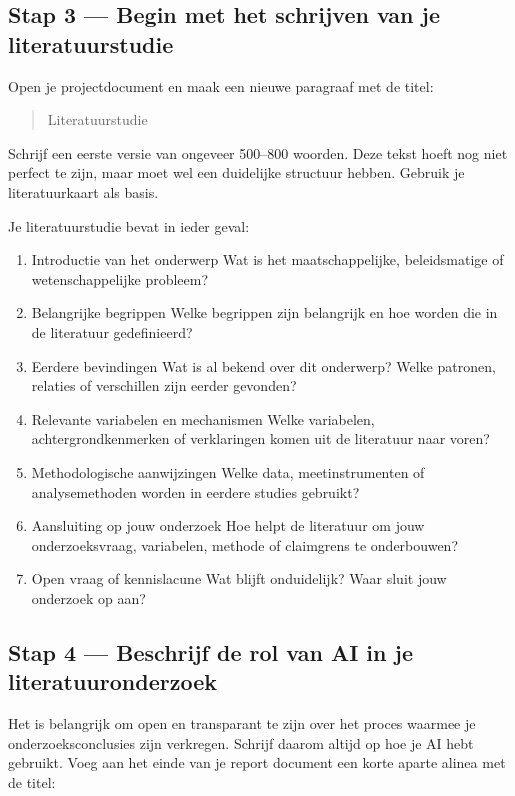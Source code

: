 \documentclass[
  letterpaper,
  DIV=11,
  numbers=noendperiod]{scrreprt}
\begin{document}
\subsection{Stap 3 --- Begin met het schrijven van je
literatuurstudie}\label{stap-3-begin-met-het-schrijven-van-je-literatuurstudie}

Open je projectdocument en maak een nieuwe paragraaf met de titel:

\begin{quote}
Literatuurstudie
\end{quote}

Schrijf een eerste versie van ongeveer 500--800 woorden. Deze tekst
hoeft nog niet perfect te zijn, maar moet wel een duidelijke structuur
hebben. Gebruik je literatuurkaart als basis.

Je literatuurstudie bevat in ieder geval:

\begin{enumerate}
\def\labelenumi{\arabic{enumi}.}
\item
  Introductie van het onderwerp Wat is het maatschappelijke,
  beleidsmatige of wetenschappelijke probleem?
\item
  Belangrijke begrippen Welke begrippen zijn belangrijk en hoe worden
  die in de literatuur gedefinieerd?
\item
  Eerdere bevindingen Wat is al bekend over dit onderwerp? Welke
  patronen, relaties of verschillen zijn eerder gevonden?
\item
  Relevante variabelen en mechanismen Welke variabelen,
  achtergrondkenmerken of verklaringen komen uit de literatuur naar
  voren?
\item
  Methodologische aanwijzingen Welke data, meetinstrumenten of
  analysemethoden worden in eerdere studies gebruikt?
\item
  Aansluiting op jouw onderzoek Hoe helpt de literatuur om jouw
  onderzoeksvraag, variabelen, methode of claimgrens te onderbouwen?
\item
  Open vraag of kennislacune Wat blijft onduidelijk? Waar sluit jouw
  onderzoek op aan?
\end{enumerate}

\subsection{Stap 4 --- Beschrijf de rol van AI in je
literatuuronderzoek}\label{stap-4-beschrijf-de-rol-van-ai-in-je-literatuuronderzoek}

Het is belangrijk om open en transparant te zijn over het proces waarmee
je onderzoeksconclusies zijn verkregen. Schrijf daarom altijd op hoe je
AI hebt gebruikt. Voeg aan het einde van je report document een korte
aparte alinea met de titel:
\end{document}
